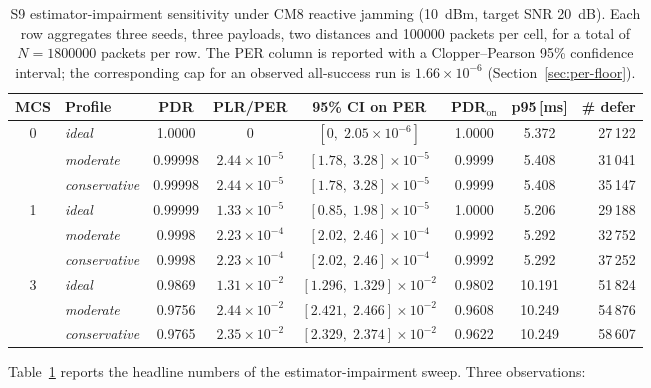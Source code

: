 \documentclass[journal,onecolumn,11pt,a4paper]{IEEEtran}
\begin{document}
\begin{table}[t]
  \centering
  \caption{S9 estimator-impairment sensitivity under CM8 reactive
  jamming (\SI{10}{dBm}, target SNR \SI{20}{dB}). Each row aggregates
  three seeds, three payloads, two distances and \num{100000} packets
  per cell, for a total of $N = \num{1800000}$ packets per row. The
  PER column is reported with a Clopper--Pearson 95\% confidence
  interval; the corresponding cap for an observed all-success run
  is $1.66\times 10^{-6}$ (Section~\ref{sec:per-floor}).}
  \label{tab:tab10}
  \footnotesize
  \begin{tabular}{c l c c c c c r}
    \toprule
    MCS & Profile & PDR & PLR/PER & 95\% CI on PER & PDR$_{\mathrm{on}}$ & p95\,[ms] & \# defer \\
    \midrule
    \multirow{3}{*}{0}
      & \emph{ideal}        & 1.0000   & $0$            & $[0,\;2.05\times 10^{-6}]$               & 1.0000 & 5.372 & 27\,122 \\
      & \emph{moderate}     & 0.99998  & $2.44\times 10^{-5}$ & $[1.78,\;3.28]\times 10^{-5}$       & 0.9999 & 5.408 & 31\,041 \\
      & \emph{conservative} & 0.99998  & $2.44\times 10^{-5}$ & $[1.78,\;3.28]\times 10^{-5}$       & 0.9999 & 5.408 & 35\,147 \\
    \midrule
    \multirow{3}{*}{1}
      & \emph{ideal}        & 0.99999  & $1.33\times 10^{-5}$ & $[0.85,\;1.98]\times 10^{-5}$       & 1.0000 & 5.206 & 29\,188 \\
      & \emph{moderate}     & 0.9998   & $2.23\times 10^{-4}$ & $[2.02,\;2.46]\times 10^{-4}$       & 0.9992 & 5.292 & 32\,752 \\
      & \emph{conservative} & 0.9998   & $2.23\times 10^{-4}$ & $[2.02,\;2.46]\times 10^{-4}$       & 0.9992 & 5.292 & 37\,252 \\
    \midrule
    \multirow{3}{*}{3}
      & \emph{ideal}        & 0.9869   & $1.31\times 10^{-2}$ & $[1.296,\;1.329]\times 10^{-2}$ & 0.9802 & 10.191 & 51\,824 \\
      & \emph{moderate}     & 0.9756   & $2.44\times 10^{-2}$ & $[2.421,\;2.466]\times 10^{-2}$ & 0.9608 & 10.249 & 54\,876 \\
      & \emph{conservative} & 0.9765   & $2.35\times 10^{-2}$ & $[2.329,\;2.374]\times 10^{-2}$ & 0.9622 & 10.249 & 58\,607 \\
    \bottomrule
  \end{tabular}
\end{table}

Table~\ref{tab:tab10} reports the headline numbers of the
estimator-impairment sweep. Three observations:
\end{document}
